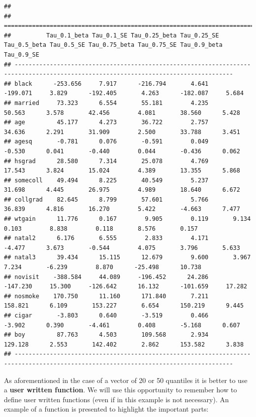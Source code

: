 \documentclass[]{book}
\begin{document}
\begin{verbatim}
##
## ====================================================================================================================================
##          Tau_0.1_beta Tau_0.1_SE Tau_0.25_beta Tau_0.25_SE Tau_0.5_beta Tau_0.5_SE Tau_0.75_beta Tau_0.75_SE Tau_0.9_beta Tau_0.9_SE
## ------------------------------------------------------------------------------------------------------------------------------------
## black      -253.656     7.917      -216.794       4.641      -199.071     3.829      -192.405       4.263      -182.087     5.684
## married     73.323      6.554       55.181        4.235       50.563      3.578       42.456        4.081       38.560      5.428
## age         45.177      4.273       36.722        2.757       34.636      2.291       31.909        2.500       33.788      3.451
## agesq       -0.781      0.076       -0.591        0.049       -0.530      0.041       -0.440        0.044       -0.436      0.062
## hsgrad      28.580      7.314       25.078        4.769       17.543      3.824       15.024        4.389       13.355      5.868
## somecoll    49.494      8.225       40.549        5.237       31.698      4.445       26.975        4.989       18.640      6.672
## collgrad    82.645      8.799       57.601        5.766       36.839      4.816       16.270        5.422       -4.663      7.477
## wtgain      11.776      0.167        9.905        0.119       9.134       0.103        8.838        0.118       8.576       0.157
## natal2      6.176       6.555        2.833        4.171       -4.477      3.673       -0.544        4.075       3.796       5.633
## natal3      39.434      15.115      12.679        9.600       3.967       7.234       -6.239        8.870      -25.498      10.738
## novisit    -388.584     44.089     -196.452      24.286      -147.230     15.300     -126.642      16.132      -101.659     17.282
## nosmoke    170.750      11.160      171.840       7.211      158.821      6.109       153.227       6.654      150.219      9.445
## cigar       -3.803      0.640       -3.519        0.466       -3.902      0.390       -4.461        0.408       -5.168      0.607
## boy         87.763      4.503       109.568       2.934      129.128      2.553       142.402       2.862      153.582      3.838
## ------------------------------------------------------------------------------------------------------------------------------------
\end{verbatim}

As aforementioned in the case of a vector of 20 or 50 quantiles it is
better to use a \textbf{user written function}. We will use this
opportunity to remember how to define user written functions (even if in
this example is not necessary). An example of a function is presented to
highlight the important parts:
\end{document}
